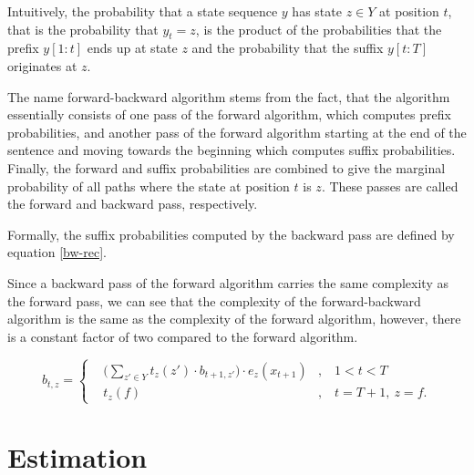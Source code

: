 Intuitively, the probability that a state sequence $y$ has state $z \in Y$
at position $t$, that is the probability that $y_t = z$, is the product
of the probabilities that the prefix $y[1:t]$ ends up at state $z$ and
the probability that the suffix $y[t:T]$ originates at $z$. 

The name forward-backward algorithm stems from the fact, that the
algorithm essentially consists of one pass of the forward algorithm,
which computes prefix probabilities, and another pass of the forward
algorithm starting at the end of the sentence and moving towards the
beginning which computes suffix probabilities. Finally, the forward
and suffix probabilities are combined to give the marginal probability
of all paths where the state at position $t$ is $z$. These passes are
called the forward and backward pass, respectively.

Formally, the suffix probabilities computed by the backward pass are
defined by equation \eqref{bw-rec}.

Since a backward pass of the forward algorithm carries the same
complexity as the forward pass, we can see that the complexity of the
forward-backward algorithm is the same as the complexity of the
forward algorithm, however, there is a constant factor of two compared
to the forward algorithm.

\begin{equation}
b_{t, z} = \left\{
\begin{aligned}
&\Bigg(\sum_{z'\in Y}t_{z}(z') \cdot  b_{t + 1, z'} \Bigg) \cdot e_{z}(x_{t+1}) & ,&\ 1 < t < T\\
&t_{z}(f) & ,&\  t = T + 1,\ z = f.
\end{aligned}
\right.
\label{bw-rec}
\end{equation}


\section{Estimation}

